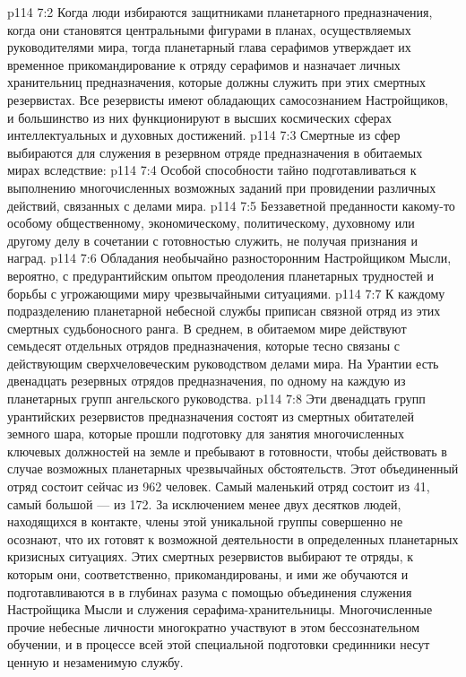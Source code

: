 \vs p114 7:2 Когда люди избираются защитниками планетарного предназначения, когда они становятся центральными фигурами в планах, осуществляемых руководителями мира, тогда планетарный глава серафимов утверждает их временное прикомандирование к отряду серафимов и назначает личных хранительниц предназначения, которые должны служить при этих смертных резервистах. Все резервисты имеют обладающих самосознанием Настройщиков, и большинство из них функционируют в высших космических сферах интеллектуальных и духовных достижений.
\vs p114 7:3 Смертные из сфер выбираются для служения в резервном отряде предназначения в обитаемых мирах вследствие:
\vs p114 7:4 \bibnobreakspace Особой способности тайно подготавливаться к выполнению многочисленных возможных заданий при провидении различных действий, связанных с делами мира.
\vs p114 7:5 \bibnobreakspace Беззаветной преданности какому\hyp{}то особому общественному, экономическому, политическому, духовному или другому делу в сочетании с готовностью служить, не получая признания и наград.
\vs p114 7:6 \bibnobreakspace Обладания необычайно разносторонним Настройщиком Мысли, вероятно, с предурантийским опытом преодоления планетарных трудностей и борьбы с угрожающими миру чрезвычайными ситуациями.
\vs p114 7:7 \pc К каждому подразделению планетарной небесной службы приписан связной отряд из этих смертных судьбоносного ранга. В среднем, в обитаемом мире действуют семьдесят отдельных отрядов предназначения, которые тесно связаны с действующим сверхчеловеческим руководством делами мира. На Урантии есть двенадцать резервных отрядов предназначения, по одному на каждую из планетарных групп ангельского руководства.
\vs p114 7:8 Эти двенадцать групп урантийских резервистов предназначения состоят из смертных обитателей земного шара, которые прошли подготовку для занятия многочисленных ключевых должностей на земле и пребывают в готовности, чтобы действовать в случае возможных планетарных чрезвычайных обстоятельств. Этот объединенный отряд состоит сейчас из 962 человек. Самый маленький отряд состоит из 41, самый большой --- из 172. За исключением менее двух десятков людей, находящихся в контакте, члены этой уникальной группы совершенно не осознают, что их готовят к возможной деятельности в определенных планетарных кризисных ситуациях. Этих смертных резервистов выбирают те отряды, к которым они, соответственно, прикомандированы, и ими же обучаются и подготавливаются в в глубинах разума с помощью объединения служения Настройщика Мысли и служения серафима\hyp{}хранительницы. Многочисленные прочие небесные личности многократно участвуют в этом бессознательном обучении, и в процессе всей этой специальной подготовки срединники несут ценную и незаменимую службу.
